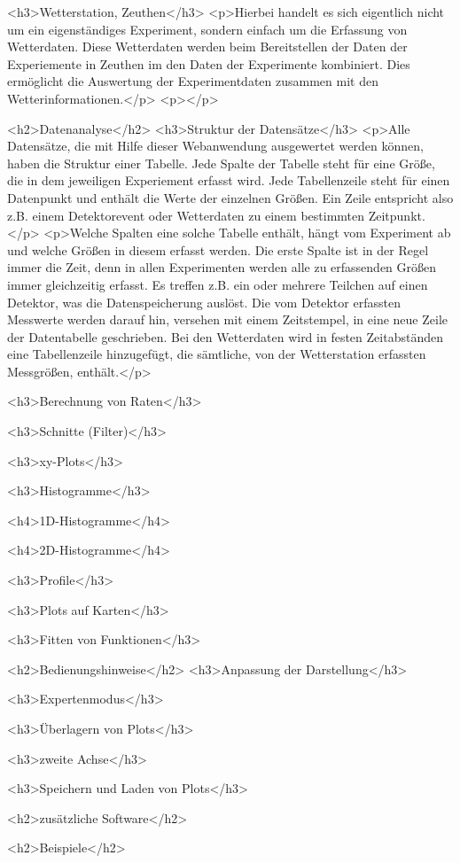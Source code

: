 \documentclass[version=last,
	a4paper,			%
	pagesize, 			%
	11pt,				%
	BCOR1cm,			%
	DIV12,	 			%
	pointlessnumbers,   %
	halfparskip,		%
]{scrreprt}
\begin{document}
                <h3>Wetterstation, Zeuthen</h3>
                    <p>Hierbei handelt es sich eigentlich nicht um ein eigenständiges Experiment, sondern einfach um die Erfassung von Wetterdaten. Diese Wetterdaten werden
                    beim Bereitstellen der Daten der Experiemente in Zeuthen im den Daten der Experimente kombiniert. Dies ermöglicht die Auswertung der Experimentdaten
                    zusammen mit den Wetterinformationen.</p>
                    <p></p>

            <h2>Datenanalyse</h2>
                <h3>Struktur der Datensätze</h3>
                    <p>Alle Datensätze, die mit Hilfe dieser Webanwendung ausgewertet werden können, haben die Struktur einer Tabelle. Jede Spalte der Tabelle steht für eine
                    Größe, die in dem jeweiligen Experiement erfasst wird. Jede Tabellenzeile steht für einen Datenpunkt und enthält die Werte der einzelnen Größen.
                    Ein Zeile entspricht also z.B. einem Detektorevent oder Wetterdaten zu einem bestimmten Zeitpunkt.</p>
                    <p>Welche Spalten eine solche Tabelle enthält, hängt vom Experiment ab und welche Größen in diesem erfasst werden. Die erste Spalte ist in der Regel immer die Zeit,
                    denn in allen Experimenten werden alle zu erfassenden Größen immer gleichzeitig erfasst. Es treffen z.B. ein oder mehrere Teilchen auf einen Detektor, was
                    die Datenspeicherung auslöst. Die vom Detektor erfassten Messwerte werden darauf hin, versehen mit einem Zeitstempel,
                    in eine neue Zeile der Datentabelle geschrieben. Bei den Wetterdaten wird in festen Zeitabständen eine Tabellenzeile hinzugefügt, die sämtliche, von der
                    Wetterstation erfassten Messgrößen, enthält.</p>


                <h3>Berechnung von Raten</h3>

                <h3>Schnitte (Filter)</h3>

                <h3>xy-Plots</h3>

                <h3>Histogramme</h3>

                    <h4>1D-Histogramme</h4>

                    <h4>2D-Histogramme</h4>

                <h3>Profile</h3>

                <h3>Plots auf Karten</h3>

                <h3>Fitten von Funktionen</h3>


            <h2>Bedienungshinweise</h2>
                <h3>Anpassung der Darstellung</h3>

                <h3>Expertenmodus</h3>

                <h3>Überlagern von Plots</h3>

                <h3>zweite Achse</h3>

                <h3>Speichern und Laden von Plots</h3>


            <h2>zusätzliche Software</h2>


            <h2>Beispiele</h2>
\end{document}
